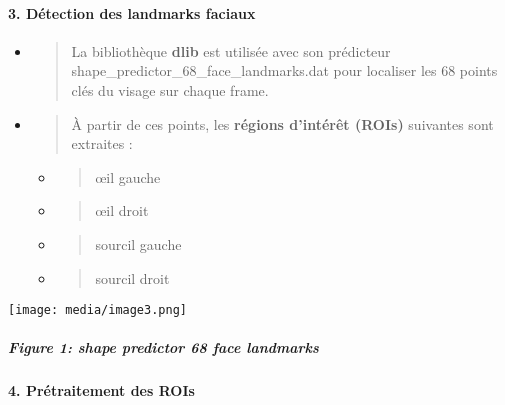 \documentclass[
]{article}
\begin{document}
\hypertarget{duxe9tection-des-landmarks-faciaux}{%
\paragraph{\texorpdfstring{\textbf{3. Détection des landmarks faciaux}}{3. Détection des landmarks faciaux}}\label{duxe9tection-des-landmarks-faciaux}}

\begin{itemize}
\item
  \begin{quote}
  La bibliothèque \textbf{dlib} est utilisée avec son prédicteur shape\_predictor\_68\_face\_landmarks.dat pour localiser les 68 points clés du visage sur chaque frame.
  \end{quote}
\item
  \begin{quote}
  À partir de ces points, les \textbf{régions d'intérêt (ROIs)} suivantes sont extraites :
  \end{quote}

  \begin{itemize}
  \item
    \begin{quote}
    œil gauche
    \end{quote}
  \item
    \begin{quote}
    œil droit
    \end{quote}
  \item
    \begin{quote}
    sourcil gauche
    \end{quote}
  \item
    \begin{quote}
    sourcil droit
    \end{quote}
  \end{itemize}
\end{itemize}

\texttt{[image: media/image3.png]}

\hypertarget{figure-1-shape-predictor-68-face-landmarks}{%
\subparagraph{Figure 1: shape predictor 68 face landmarks}\label{figure-1-shape-predictor-68-face-landmarks}}

\hypertarget{pruxe9traitement-des-rois}{%
\paragraph{\texorpdfstring{\textbf{4. Prétraitement des ROIs}}{4. Prétraitement des ROIs}}\label{pruxe9traitement-des-rois}}
\end{document}
